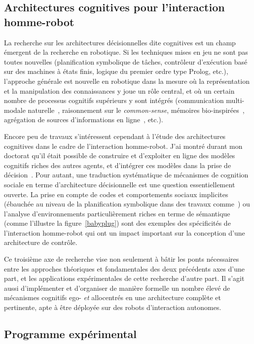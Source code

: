 \documentclass[a4paper]{article}
\begin{document}
\subsection{Architectures cognitives pour l'interaction homme-robot}

La recherche sur les architectures décisionnelles dite cognitives est un champ
émergent de la recherche en robotique. Si les techniques mises en jeu ne sont
pas toutes nouvelles (planification symbolique de tâches, contrôleur d'exécution
basé sur des machines à états finis, logique du premier ordre type Prolog,
etc.), l'approche générale est nouvelle en robotique dans la mesure où la
représentation et la manipulation des connaissances y joue un rôle central, et
où un certain nombre de processus cognitifs supérieurs y sont intégrés
(communication multi-modale naturelle~\cite{Chen2010, Lemaignan2011a},
raisonnement sur le \emph{common-sense}, mémoires
bio-inspirées~\cite{trafton2013act}, agrégation de sources d'informations en
ligne~\cite{Beetz2010}, etc.).

Encore peu de travaux s'intéressent cependant à l'étude des architectures
cognitives dans le cadre de l'interaction homme-robot. J'ai montré durant mon
doctorat qu'il était possible de construire et d'exploiter en ligne des modèles
cognitifs riches des autres agents, et d'intégrer ces modèles dans la prise de
décision~\cite{alami2011when, warnier2012when, lemaignan2014human}. Pour autant,
une traduction systématique de mécanismes de cognition sociale en terme
d'architecture décisionnelle est une question essentiellement ouverte. La prise
en compte de codes et comportements sociaux implicites (ébauchée au niveau de la
planification symbolique dans des travaux comme~\cite{Alili2009}) ou l'analyse
d'environnements particulièrement riches en terme de sémantique (comme
l'illustre la figure~\ref{babyplug}) sont des exemples des spécificités de
l'interaction homme-robot qui ont un impact important sur la conception d'une
architecture de contrôle.

Ce troisième axe de recherche vise non seulement à bâtir les ponts nécessaires
entre les approches théoriques et fondamentales des deux précédents axes d'une
part, et les applications expérimentales de cette recherche d'autre part. Il
s'agit aussi d'implémenter et d'organiser de manière formelle un nombre élevé de
mécanismes cognitifs ego- \emph{et} allocentrés en une architecture complète et pertinente, apte à être
déployée sur des robots d'interaction autonomes.

\subsection{Programme expérimental}
\end{document}

